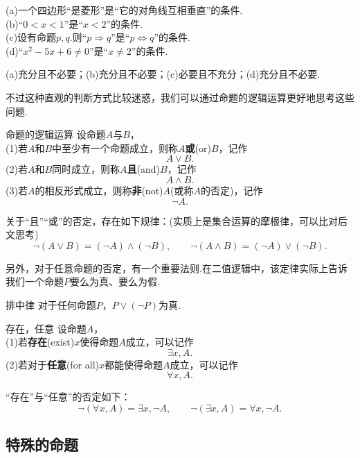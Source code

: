 \documentclass[lang=cn, zihao=5]{elegantbook}
\newcommand{\tk}{\uline{\hspace{4em}}}
\begin{document}
\begin{example}
	(a)一个四边形“是菱形”是“它的对角线互相垂直”的\tk 条件. \\
	(b)“$0<x<1$”是“$x<2$”的\tk 条件. \\
	(c)设有命题$p,q$.则“$p \Rightarrow q$”是“$p \Leftrightarrow q$”的\tk 条件. \\
	(d)“$x^2-5x+6 \neq 0$”是“$x \neq 2$”的\tk 条件.
\end{example}
\begin{solution}
	(a)充分且不必要；(b)充分且不必要；(c)必要且不充分；(d)充分且不必要.
\end{solution}

不过这种直观的判断方式比较迷惑，我们可以通过命题的逻辑运算更好地思考这些问题.

\begin{definition}{命题的逻辑运算} %
	设命题$A$与$B$， \\
	(1)若$A$和$B$中至少有一个命题成立，则称$A$\textbf{或}(or)$B$，记作$$A \vee B.$$
	(2)若$A$和$B$同时成立，则称$A$\textbf{且}(and)$B$，记作$$A \wedge B.$$
	(3)若$A$的相反形式成立，则称\textbf{非}(not)$A$(或称$A$的否定)，记作$$\neg A.$$
\end{definition}
\begin{remark}
	关于“且”“或”的否定，存在如下规律：(实质上是集合运算的摩根律，可以比对后文思考)
	$$\neg (A \vee B) = (\neg A) \wedge (\neg B),\qquad \neg (A \wedge B) = (\neg A) \vee (\neg B).$$
\end{remark}

另外，对于任意命题的否定，有一个重要法则.在二值逻辑中，该定律实际上告诉我们一个命题$P$要么为真、要么为假.

\begin{theorem}{排中律}
	对于任何命题$P$，$P \vee (\neg P)$为真.
\end{theorem}

\begin{definition}{存在，任意}
	设命题$A$， \\
	(1)若\textbf{存在}(exist)$x$使得命题$A$成立，可以记作$$\exists x,A.$$
	(2)若对于\textbf{任意}(for all)$x$都能使得命题$A$成立，可以记作$$\forall x,A.$$
\end{definition}
\begin{remark}
	“存在”与“任意”的否定如下：
	$$\neg (\forall x,A) = \exists x,\neg A,\qquad \neg (\exists x,A) = \forall x,\neg A.$$
\end{remark}

\subsection{特殊的命题}
\end{document}
